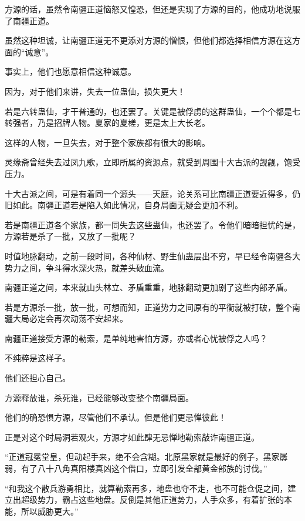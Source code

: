 
\begin{this_body}



方源的话，虽然令南疆正道恼怒又惶恐，但还是实现了方源的目的，他成功地说服了南疆正道。

虽然这种坦诚，让南疆正道无不更添对方源的憎恨，但他们都选择相信方源在这方面的“诚意”。

事实上，他们也愿意相信这种诚意。

因为，对于他们来讲，失去一位蛊仙，损失更大！

若是六转蛊仙，才干普通的，也还罢了。关键是被俘虏的这群蛊仙，一个个都是七转强者，乃是招牌人物。夏家的夏槎，更是太上大长老。

这样的人物，一旦失去，对于整个家族都有很大的影响。

灵缘斋曾经失去过凤九歌，立即所属的资源点，就受到周围十大古派的觊觎，饱受压力。

十大古派之间，可是有着同一个源头——天庭，论关系可比南疆正道要近得多，仍旧如此。南疆正道若是陷入如此情况，自身局面无疑会更加不利。

若是南疆正道各个家族，都一同失去这些蛊仙，也还罢了。令他们暗暗担忧的是，方源若是杀了一批，又放了一批呢？

时值地脉翻动，之前一段时间，各种仙材、野生仙蛊层出不穷，早已经令南疆各大势力之间，争斗得水深火热，就差头破血流。

南疆正道之间，本来就山头林立、矛盾重重，地脉翻动更加剧了这些内部矛盾。

若是方源杀一批，放一批，可想而知，正道势力之间原有的平衡就被打破，整个南疆大局必定会再次动荡不安起来。

南疆正道接受方源的勒索，是单纯地害怕方源，亦或者心忧被俘之人吗？

不纯粹是这样子。

他们还担心自己。

方源释放谁，杀死谁，已经能够改变整个南疆局面。

他们的确恐惧方源，尽管他们不承认。但是他们更忌惮彼此！

正是对这个时局洞若观火，方源才如此肆无忌惮地勒索敲诈南疆正道。

“正道冠冕堂皇，但动起手来，绝不会含糊。北原黑家就是最好的例子，黑家孱弱，有了八十八角真阳楼真凶这个借口，立即引发全部黄金部族的讨伐。”

“和我这个散兵游勇相比，就算勒索再多，地盘也夺不走，也不可能仓促之间，建立出超级势力，霸占这些地盘。反倒是其他正道势力，人手众多，有着扩张的本能，所以威胁更大。”


\end{this_body}
